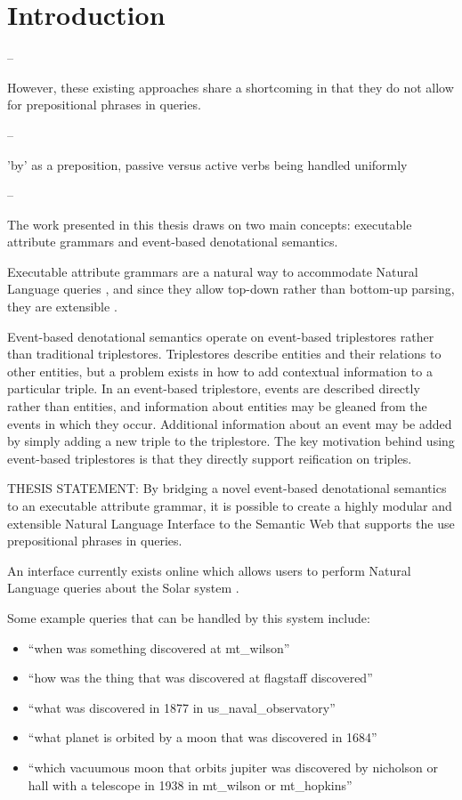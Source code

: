 \documentclass[../main.tex]{subfiles}
\begin{document}
\chapter{Introduction}




--

However, these existing approaches share a shortcoming in that they do not allow for prepositional phrases in queries.

--

'by' as a preposition, passive versus active verbs being handled uniformly

--

The work presented in this thesis draws on two main concepts: executable attribute grammars\cite{?} and event-based denotational semantics\cite{?}.

Executable attribute grammars are a natural way to accommodate Natural Language queries \cite{?}, and since they allow top-down rather than bottom-up parsing, they are extensible \cite{?}.

Event-based denotational semantics operate on event-based triplestores\cite{?} rather than traditional triplestores.  Triplestores describe entities and their relations to other entities, but a problem exists in how to add contextual information to a particular triple.  In an event-based triplestore, events are described directly rather than entities, and information about entities may be gleaned from the events in which they occur.  Additional information about an event may be added by simply adding a new triple to the triplestore.  The key motivation behind using event-based triplestores is that they directly support reification on triples\cite{?}.

THESIS STATEMENT: By bridging a novel event-based denotational semantics to an executable attribute grammar, it is possible to create a highly modular and extensible Natural Language Interface to the Semantic Web that supports the use prepositional phrases in queries.

An interface currently exists online which allows users to perform Natural Language queries about the Solar system \cite{Solarman:2016}.

Some example queries that can be handled by this system include:

\begin{itemize}
	\item ``when was something discovered at mt\_wilson''
	\item ``how was the thing that was discovered at flagstaff discovered''
	\item ``what was discovered in 1877 in us\_naval\_observatory''
	\item ``what planet is orbited by a moon that was discovered in 1684''
	\item ``which vacuumous moon that orbits jupiter was discovered by nicholson or hall with a telescope in 1938 in mt\_wilson or mt\_hopkins''
\end{itemize}
\end{document}
